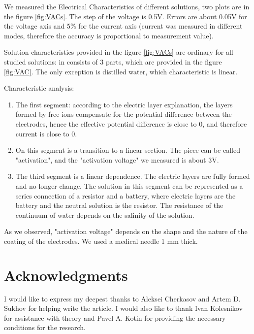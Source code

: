 \documentclass{article}
\begin{document}
We measured the Electrical Characteristics of different solutions, two plots are in the figure \ref{fig:VACs}. The step of the voltage is 0.5V. Errors are about 0.05V for the voltage axis and 5\% for the current axis (current was measured in different modes, therefore the accuracy is proportional to measurement value).

Solution characteristics provided in the figure \ref{fig:VACs} are ordinary for all studied solutions: in consists of 3 parts, which are provided in the figure \ref{fig:VAC}. The only exception is distilled water, which characteristic is linear.


Characteristic analysis:
\begin{enumerate}   
\item The first segment: according to the electric layer explanation, the layers formed by free ions compensate for the potential difference between the electrodes, hence the effective potential difference is close to 0, and therefore current is close to 0.

\item On this segment is a transition to a linear section. The piece can be called "activation", and the "activation voltage" we measured is about 3V.

\item The third segment is a linear dependence. The electric layers are fully formed and no longer change. The solution in this segment can be represented as a series connection of a resistor and a battery, where electric layers are the battery and the neutral solution is the resistor. The resistance of the continuum of water depends on the salinity of the solution.
\end{enumerate}

As we observed, "activation voltage" depends on the shape and the nature of the coating of the electrodes. We used a medical needle 1 mm thick.



\section{Acknowledgments}
I would like to express my deepest thanks to Aleksei Cherkasov and Artem D. Sukhov for helping write the article. I would also like to thank Ivan Kolesnikov for assistance with theory and Pavel A. Kotin for providing the necessary conditions for the research.



\end{document}
